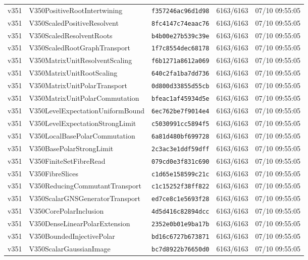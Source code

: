\documentclass[11pt]{article}
\theoremstyle{definition}\newtheorem{deriv}{Derivação}
\begin{document}
{\begin{longtable}{@{}lllll@{}}
v351 & V350PositiveRootIntertwining & \texttt{f357246ac96d1d98} & 6163/6163 & 07/10 09:55:05 \\
v351 & V350ScaledPositiveResolvent & \texttt{8fc4147c74eaac76} & 6163/6163 & 07/10 09:55:05 \\
v351 & V350ScaledResolventRoots & \texttt{b4b00e27b539c39e} & 6163/6163 & 07/10 09:55:05 \\
v351 & V350ScaledRootGraphTransport & \texttt{1f7c8554dec68178} & 6163/6163 & 07/10 09:55:05 \\
v351 & V350MatrixUnitResolventScaling & \texttt{f6b1271a8612a069} & 6163/6163 & 07/10 09:55:05 \\
v351 & V350MatrixUnitRootScaling & \texttt{640c2fa1ba7dd736} & 6163/6163 & 07/10 09:55:05 \\
v351 & V350MatrixUnitPolarTransport & \texttt{0d800d33855d55cb} & 6163/6163 & 07/10 09:55:05 \\
v351 & V350MatrixUnitPolarCommutation & \texttt{bfeac1af45934d5e} & 6163/6163 & 07/10 09:55:05 \\
v351 & V350LevelExpectationUniformBound & \texttt{6ec762be7f9014e4} & 6163/6163 & 07/10 09:55:05 \\
v351 & V350LevelExpectationStrongLimit & \texttt{c5030991cc5894f5} & 6163/6163 & 07/10 09:55:05 \\
v351 & V350LocalBasePolarCommutation & \texttt{6a81d480bf699728} & 6163/6163 & 07/10 09:55:05 \\
v351 & V350BasePolarStrongLimit & \texttt{2c3ac3e1ddf59dff} & 6163/6163 & 07/10 09:55:05 \\
v351 & V350FiniteSetFibreRead & \texttt{079cd0e3f831c690} & 6163/6163 & 07/10 09:55:05 \\
v351 & V350FibreSlices & \texttt{c1d65e158599c21c} & 6163/6163 & 07/10 09:55:05 \\
v351 & V350ReducingCommutantTransport & \texttt{c1c15252f38ff822} & 6163/6163 & 07/10 09:55:05 \\
v351 & V350ScalarGNSGeneratorTransport & \texttt{ed7ce8c1e5693f28} & 6163/6163 & 07/10 09:55:05 \\
v351 & V350CorePolarInclusion & \texttt{4d5d416c82894dcc} & 6163/6163 & 07/10 09:55:05 \\
v351 & V350DenseLinearPolarExtension & \texttt{2352e0b01e9ba17b} & 6163/6163 & 07/10 09:55:05 \\
v351 & V350BoundedInjectivePolar & \texttt{bd16c6727b673871} & 6163/6163 & 07/10 09:55:05 \\
v351 & V350ScalarGaussianImage & \texttt{bc7d8922b76650d0} & 6163/6163 & 07/10 09:55:05 \\

\end{longtable}}
\end{document}
